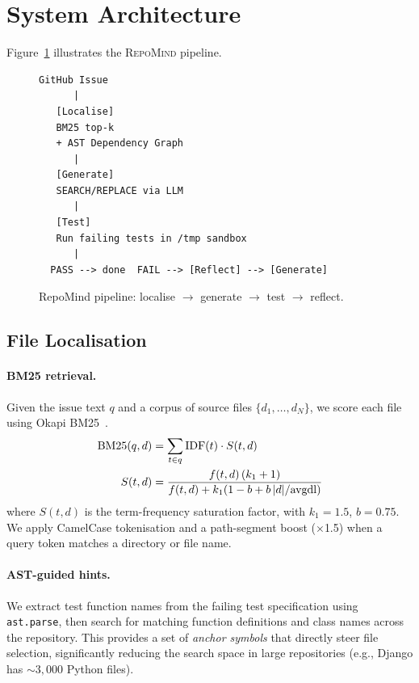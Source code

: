 \documentclass[11pt]{article}
\begin{document}
\section{System Architecture}
\label{sec:architecture}

Figure~\ref{fig:pipeline} illustrates the \textsc{RepoMind} pipeline.

\begin{figure}[H]
\centering
\begin{lstlisting}[language={},frame=single]
GitHub Issue
      |
   [Localise]
   BM25 top-k
   + AST Dependency Graph
      |
   [Generate]
   SEARCH/REPLACE via LLM
      |
   [Test]
   Run failing tests in /tmp sandbox
      |
  PASS --> done  FAIL --> [Reflect] --> [Generate]
\end{lstlisting}
\caption{RepoMind pipeline: localise $\to$ generate $\to$ test $\to$ reflect.}
\label{fig:pipeline}
\end{figure}

\subsection{File Localisation}

\paragraph{BM25 retrieval.}
Given the issue text $q$ and a corpus of source files $\{d_1,\ldots,d_N\}$, we
score each file using Okapi BM25~\cite{robertson2009probabilistic}.
\begin{align}
\text{BM25}(q,d) &= \sum_{t \in q} \mathrm{IDF}(t) \cdot S(t,d) \notag \\
S(t,d) &= \frac{f(t,d)\,(k_1+1)}{f(t,d) + k_1(1 - b + b\,|d|/\text{avgdl})}
\end{align}
where $S(t,d)$ is the term-frequency saturation factor, with $k_1{=}1.5$,
$b{=}0.75$. We apply CamelCase tokenisation and a path-segment boost
($\times$1.5) when a query token matches a directory or file name.

\paragraph{AST-guided hints.}
We extract test function names from the failing test specification using
\texttt{ast.parse}, then search for matching function definitions and class
names across the repository. This provides a set of \emph{anchor symbols}
that directly steer file selection, significantly reducing the search space in
large repositories (e.g., Django has ${\sim}3{,}000$ Python files).
\end{document}
